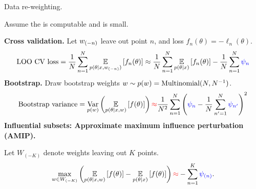 \begin{frame}[t]{Data re-weighting.}


Assume the  is computable and  is small.
%
\expansion{}


\pause
\textbf{Cross validation.} 
Let $w_{(-n)}$ leave out point $n$, and loss
$f_n(\theta) = -\ell_n(\theta)$.
%
%
\begin{align*}
\textrm{LOO CV loss} =
\frac{1}{N}\sum_{n=1}^N \underset{p(\theta \vert x, w_{(-n)})}{\mathbb{E}}\left[f_n(\theta)\right]
\approx 
\frac{1}{N}\sum_{n=1}^N \underset{p(\theta \vert x)}{\mathbb{E}}\left[f_n(\theta)\right] - \frac{1}{N}\sum_{n=1}^N \textcolor{blue}{\psi_n}
\end{align*}
%
%
\pause
\textbf{Bootstrap.}
Draw bootstrap
weights $w \sim p(w) = \textrm{Multinomial}(N, N^{-1})$.
%
\begin{align*}
%
\textrm{Bootstrap variance} =
\var{\p(\w)}{\expect{p(\theta \vert \x, w)}{f(\theta)}}
\red{\approx} \frac{1}{N^2} \sumn \left(\blue{\infl_n} -
    \frac{1}{N} \sum_{n'=1}^N \blue{\infl_{n'}} \right)^2
%
\end{align*}
%
\pause
\textbf{Influential subsets:
Approximate maximum influence perturbation (AMIP).}

Let $W_{(-K)}$ denote weights leaving out $K$ points.
%
\begin{align*}
%
\max_{\w \in W_{(-K)}} \left(
\expect{p(\theta \vert \x, w)}{f(\theta)} -
\expect{p(\theta \vert \x)}{f(\theta)}
\right) \red{\approx} - \sum_{n=1}^K \blue{\infl_{(n)}}.
%
\end{align*}
%

\end{frame}
